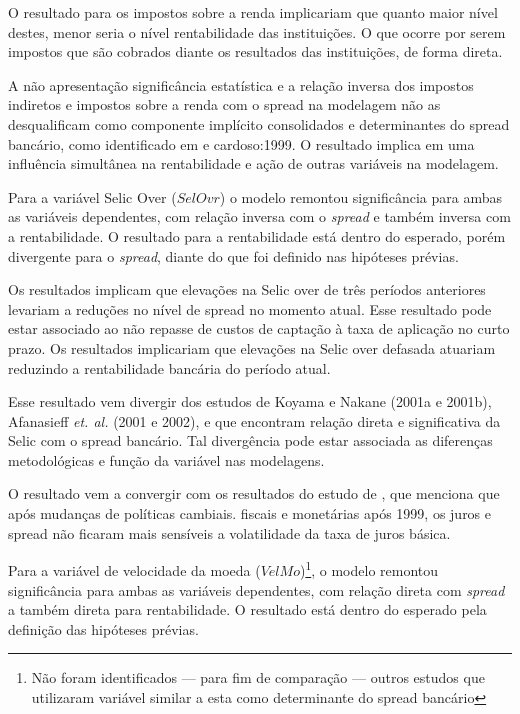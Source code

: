 \documentclass[
  12pt,
  12pt,
  openright,
  oneside,
  a4paper,
  chapter=TITLE,
  section=TITLE,
  subsection=TITLE,
  subsubsection=TITLE,
  english,
  portugues,
  sumario=tradicional]{abntex2}
\begin{document}
O resultado para os impostos sobre a renda implicariam que quanto maior nível destes, menor seria o nível rentabilidade das instituições. O que ocorre por serem impostos que são cobrados diante os resultados das instituições, de forma direta.

A não apresentação significância estatística e a relação inversa dos impostos indiretos e impostos sobre a renda com o spread na modelagem não as desqualificam como componente implícito consolidados e determinantes do spread bancário, como identificado em \textcite{BACEN} e cardoso:1999. O resultado implica em uma influência simultânea na rentabilidade e ação de outras variáveis na modelagem.

Para a variável Selic Over (\(SelOvr\)) o modelo remontou significância para ambas as variáveis dependentes, com relação inversa com o \emph{spread} e também inversa com a rentabilidade. O resultado para a rentabilidade está dentro do esperado, porém divergente para o \emph{spread}, diante do que foi definido nas hipóteses prévias.

Os resultados implicam que elevações na Selic over de três períodos anteriores levariam a reduções no nível de spread no momento atual. Esse resultado pode estar associado ao não repasse de custos de captação à taxa de aplicação no curto prazo. Os resultados implicariam que elevações na Selic over defasada atuariam reduzindo a rentabilidade bancária do período atual.

Esse resultado vem divergir dos estudos de Koyama e Nakane (2001a e 2001b), Afanasieff \emph{et. al.} (2001 e 2002), \textcite{oreiro-2006} e \textcite{durigan:2018} que encontram relação direta e significativa da Selic com o spread bancário. Tal divergência pode estar associada as diferenças metodológicas e função da variável nas modelagens.

O resultado vem a convergir com os resultados do estudo de \textcite{BCB:1999}, que menciona que após mudanças de políticas cambiais. fiscais e monetárias após 1999, os juros e spread não ficaram mais sensíveis a volatilidade da taxa de juros básica.

Para a variável de velocidade da moeda (\(VelMo\))\footnote{Não foram identificados — para fim de comparação — outros estudos que utilizaram variável similar a esta como determinante do spread bancário}, o modelo remontou significância para ambas as variáveis dependentes, com relação direta com \emph{spread} a também direta para rentabilidade. O resultado está dentro do esperado pela definição das hipóteses prévias.
\end{document}
